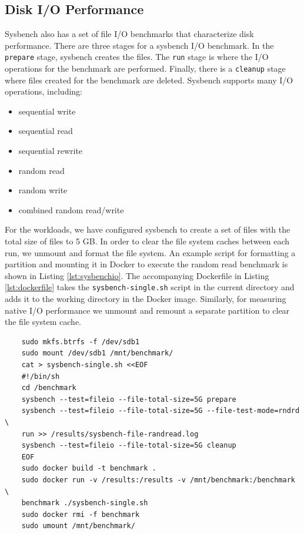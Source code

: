 \documentclass[11pt]{article}
\begin{document}
	\subsection{Disk I/O Performance}
	Sysbench also has a set of file I/O benchmarks that characterize disk performance. There are three stages for a sysbench I/O benchmark. In the \texttt{prepare} stage, sysbench creates the files. The \texttt{run} stage is where the I/O operations for the benchmark are performed. Finally, there is a \texttt{cleanup} stage where files created for the benchmark are deleted. Sysbench supports many I/O operations, including:
	\begin{itemize}
		\item sequential write
		\item sequential read
		\item sequential rewrite
		\item random read
		\item random write
		\item combined random read/write
	\end{itemize}
	For the workloads, we have configured sysbench to create a set of files with the total size of files to 5 GB. In order to clear the file system caches between each run, we unmount and format the file system. An example script for formatting a partition and mounting it in Docker to execute the random read benchmark is shown in Listing \ref{lst:sysbenchio}. The accompanying Dockerfile in Listing \ref{lst:dockerfile} takes the \texttt{sysbench-single.sh} script in the current directory and adds it to the working directory in the Docker image. Similarly, for measuring native I/O performance we unmount and remount a separate partition to clear the file system cache. 
	
	\lstset{caption=Sysbench File I/O Random Read Bash Script, label=lst:sysbenchio}
	\begin{lstlisting}
	sudo mkfs.btrfs -f /dev/sdb1
	sudo mount /dev/sdb1 /mnt/benchmark/
	cat > sysbench-single.sh <<EOF
	#!/bin/sh
	cd /benchmark
	sysbench --test=fileio --file-total-size=5G prepare
	sysbench --test=fileio --file-total-size=5G --file-test-mode=rndrd \
	run >> /results/sysbench-file-randread.log
	sysbench --test=fileio --file-total-size=5G cleanup
	EOF
	sudo docker build -t benchmark .
	sudo docker run -v /results:/results -v /mnt/benchmark:/benchmark \
	benchmark ./sysbench-single.sh
	sudo docker rmi -f benchmark
	sudo umount /mnt/benchmark/
	\end{lstlisting}
	
\end{document}
